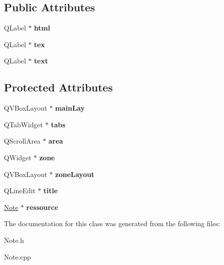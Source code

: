 \subsection*{\-Public \-Attributes}
\begin{DoxyCompactItemize}
\item 
\hypertarget{classNoteEditor_aec807709a39702dbdf3fac3cc9e16438}{\-Q\-Label $\ast$ {\bfseries html}}\label{classNoteEditor_aec807709a39702dbdf3fac3cc9e16438}

\item 
\hypertarget{classNoteEditor_af85b66c4bec552de741f1e2e95bf07da}{\-Q\-Label $\ast$ {\bfseries tex}}\label{classNoteEditor_af85b66c4bec552de741f1e2e95bf07da}

\item 
\hypertarget{classNoteEditor_acbd842c53fac8acf986ca89e30a29563}{\-Q\-Label $\ast$ {\bfseries text}}\label{classNoteEditor_acbd842c53fac8acf986ca89e30a29563}

\end{DoxyCompactItemize}
\subsection*{\-Protected \-Attributes}
\begin{DoxyCompactItemize}
\item 
\hypertarget{classNoteEditor_a8d452060ccda16b6fa01dd3888cdd26e}{\-Q\-V\-Box\-Layout $\ast$ {\bfseries main\-Lay}}\label{classNoteEditor_a8d452060ccda16b6fa01dd3888cdd26e}

\item 
\hypertarget{classNoteEditor_ae8addf8ac12731112c793d2d6655587b}{\-Q\-Tab\-Widget $\ast$ {\bfseries tabs}}\label{classNoteEditor_ae8addf8ac12731112c793d2d6655587b}

\item 
\hypertarget{classNoteEditor_a15706f3ea231b43f81c94dc264654d73}{\-Q\-Scroll\-Area $\ast$ {\bfseries area}}\label{classNoteEditor_a15706f3ea231b43f81c94dc264654d73}

\item 
\hypertarget{classNoteEditor_a9f20e3eb7fb6fef386804d67689480db}{\-Q\-Widget $\ast$ {\bfseries zone}}\label{classNoteEditor_a9f20e3eb7fb6fef386804d67689480db}

\item 
\hypertarget{classNoteEditor_aa4d46395b4ce04546ea559b9c97c76e9}{\-Q\-V\-Box\-Layout $\ast$ {\bfseries zone\-Layout}}\label{classNoteEditor_aa4d46395b4ce04546ea559b9c97c76e9}

\item 
\hypertarget{classNoteEditor_aa064cabc61e851768c410689bf169f39}{\-Q\-Line\-Edit $\ast$ {\bfseries title}}\label{classNoteEditor_aa064cabc61e851768c410689bf169f39}

\item 
\hypertarget{classNoteEditor_a96f175025780f6b0084f8b9e74cda56a}{\hyperlink{classNote}{\-Note} $\ast$ {\bfseries ressource}}\label{classNoteEditor_a96f175025780f6b0084f8b9e74cda56a}

\end{DoxyCompactItemize}


\-The documentation for this class was generated from the following files\-:\begin{DoxyCompactItemize}
\item 
\-Note.\-h\item 
\-Note.\-cpp\end{DoxyCompactItemize}
